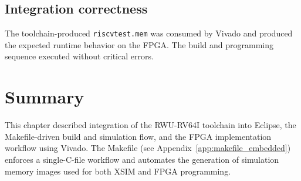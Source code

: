 \subsection{Integration correctness}
The toolchain-produced \texttt{riscvtest.mem} was consumed by Vivado and produced the expected runtime behavior on the FPGA. The build and programming sequence executed without critical errors.

\section{Summary}
This chapter described integration of the RWU-RV64I toolchain into Eclipse, the Makefile-driven build and simulation flow, and the FPGA implementation workflow using Vivado.  
The Makefile (see Appendix~\ref{app:makefile_embedded}) enforces a single-C-file workflow and automates the generation of simulation memory images used for both XSIM and FPGA programming.  